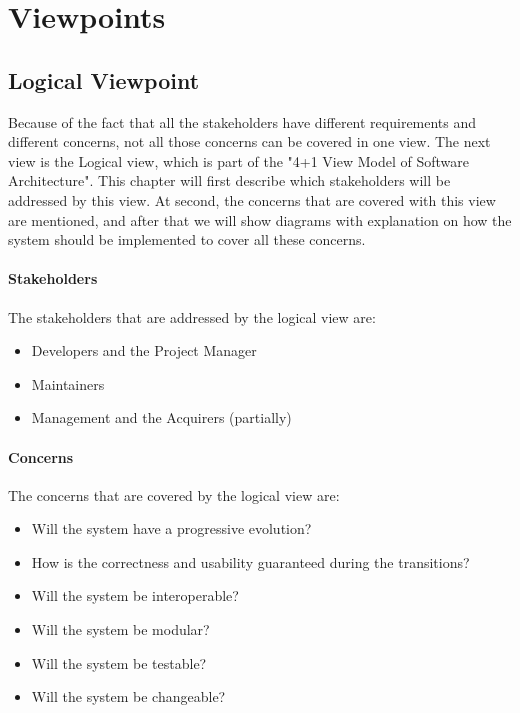 \chapter{Viewpoints}

\section{Logical Viewpoint}
Because of the fact that all the stakeholders have different requirements and 
different concerns, not all those concerns can be covered in one view. The next view
is the Logical view, which is part of the "4+1 View Model of Software Architecture".
This chapter will first describe which stakeholders will be addressed by this view.
At second, the concerns that are covered with this view are mentioned, and after that
we will show diagrams with explanation on how the system should be implemented to 
cover all these concerns.

\subsubsection{Stakeholders}
The stakeholders that are addressed by the logical view are:
\begin{itemize}
\item Developers and the Project Manager
\item Maintainers
\item Management and the Acquirers (partially)
\end{itemize}

\subsubsection{Concerns}
The concerns that are covered by the logical view are:
\begin{itemize}
\item Will the system have a progressive evolution? %
\item How is the correctness and usability guaranteed during the transitions? %
\item Will the system be interoperable? %
\item Will the system be modular? %
\item Will the system be testable? %
\item Will the system be changeable? %
\end{itemize}

